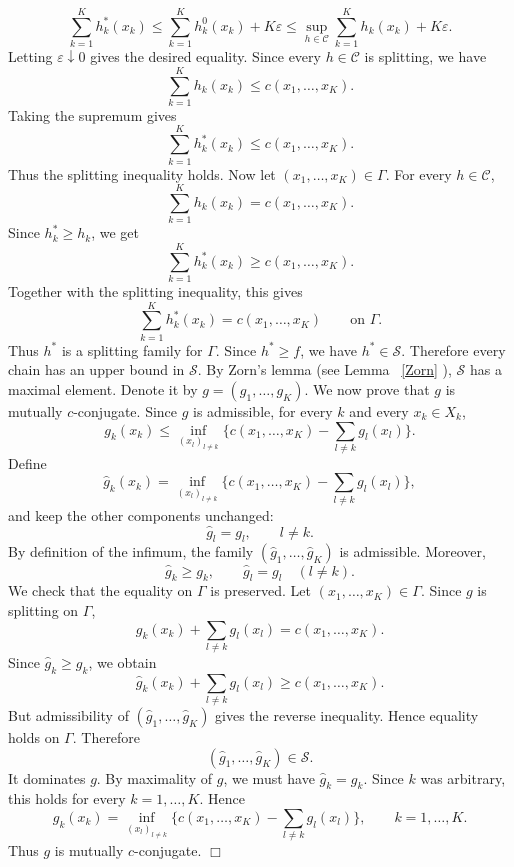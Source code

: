 \documentclass[twoside,11pt,a4paper]{article}
\newcommand*{\SavedRef}{}
\let\SavedRef\ref
\renewcommand*{\ref}[1]{  \begingroup
    \hypersetup{
      linkcolor=linkequation,
      linkbordercolor=linkequation,
    }    \SavedRef{#1}  \endgroup
}
\begin{document}
\[
\sum_{k=1}^K h_k^*(x_k)
\le
\sum_{k=1}^K h_k^0(x_k)+K\varepsilon
\le
\sup_{h\in\mathcal C}\sum_{k=1}^K h_k(x_k)+K\varepsilon.
\]
Letting \(\varepsilon\downarrow0\) gives the desired equality.
Since every \(h\in\mathcal C\) is splitting, we have
\[
\sum_{k=1}^K h_k(x_k)\le c(x_1,\ldots,x_K).
\]
Taking the supremum gives
\[
\sum_{k=1}^K h_k^*(x_k)\le c(x_1,\ldots,x_K).
\]
Thus the splitting inequality holds.
Now let \((x_1,\ldots,x_K)\in\Gamma\). For every \(h\in\mathcal C\),
\[
\sum_{k=1}^K h_k(x_k)=c(x_1,\ldots,x_K).
\]
Since \(h_k^*\ge h_k\), we get
\[
\sum_{k=1}^K h_k^*(x_k)\ge c(x_1,\ldots,x_K).
\]
Together with the splitting inequality, this gives
\[
\sum_{k=1}^K h_k^*(x_k)=c(x_1,\ldots,x_K)
\qquad\text{on }\Gamma.
\]
Thus \(h^*\) is a splitting family for \(\Gamma\). Since \(h^*\ge f\), we have
\(h^*\in\mathcal S\). Therefore every chain has an upper bound in
\(\mathcal S\). By Zorn's lemma (see Lemma~\ref{Zorn}), \(\mathcal S\) has a
maximal element. Denote it by $
g=(g_1,\ldots,g_K)$.
We now prove that \(g\) is mutually \(c\)-conjugate. Since \(g\) is admissible,
for every \(k\) and every \(x_k\in X_k\),
\[
g_k(x_k)
\le
\inf_{(x_l)_{l\ne k}}
\Big\{
c(x_1,\ldots,x_K)-\sum_{l\ne k}g_l(x_l)
\Big\}.
\]
Define
\[
\widehat g_k(x_k)
=
\inf_{(x_l)_{l\ne k}}
\Big\{
c(x_1,\ldots,x_K)-\sum_{l\ne k}g_l(x_l)
\Big\},
\]
and keep the other components unchanged:
\[
\widehat g_l=g_l,\qquad l\ne k.
\]
By definition of the infimum, the family $
(\widehat g_1,\ldots,\widehat g_K)$
is admissible. Moreover,
\[
\widehat g_k\ge g_k,
\qquad
\widehat g_l=g_l\quad(l\ne k).
\]
We check that the equality on \(\Gamma\) is preserved. Let
\((x_1,\ldots,x_K)\in\Gamma\). Since \(g\) is splitting on \(\Gamma\),
\[
g_k(x_k)+\sum_{l\ne k}g_l(x_l)=c(x_1,\ldots,x_K).
\]
Since \(\widehat g_k\ge g_k\), we obtain
\[
\widehat g_k(x_k)+\sum_{l\ne k}g_l(x_l)\ge c(x_1,\ldots,x_K).
\]
But admissibility of \((\widehat g_1,\ldots,\widehat g_K)\) gives the reverse
inequality. Hence equality holds on \(\Gamma\). Therefore
\[
(\widehat g_1,\ldots,\widehat g_K)\in\mathcal S.
\]
It dominates \(g\). By maximality of \(g\), we must have $
\widehat g_k=g_k$.
Since \(k\) was arbitrary, this holds for every \(k=1,\ldots,K\). Hence
\[
g_k(x_k)
=
\inf_{(x_l)_{l\ne k}}
\Big\{
c(x_1,\ldots,x_K)-\sum_{l\ne k}g_l(x_l)
\Big\},
\qquad k=1,\ldots,K.
\]
Thus \(g\) is mutually \(c\)-conjugate.
\hfill\(\Box\)
\end{document}
